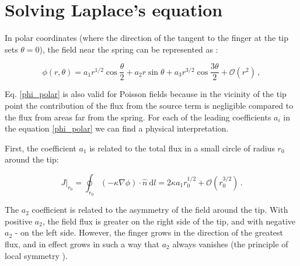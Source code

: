 \documentclass[]{pracamgr}
\begin{document}
  \section{Solving Laplace's equation}\label{chapter:solving}
    
    In polar coordinates (where the direction of the tangent to the finger at the tip sets $\theta = 0$), the field near the spring can be represented as \cite{derrida1992needle , petroff2013bifurcation}:
    
    \begin{equation}\label{phi_polar}
      \phi(r,\theta)=a_1r^{1/2}\cos\frac{\theta}{2}+a_2r \sin \theta+a_3 r^{3/2} \cos\frac{3\theta}{2}+\mathcal{O}\left(r^2\right) \,,
    \end{equation}

    Eq. \eqref{phi_polar} is also valid for Poisson fields because in the vicinity of the tip point the contribution of the flux from the source term is negligible compared to the flux from areas far from the spring. For each of the leading coefficients $a_i$ in the equation \eqref{phi_polar} we can find a physical interpretation.

    First, the coefficient $a_1$ is related to the total flux in a small circle of radius $r_0$ around the tip: 
    
    \begin{equation}\label{circle}
      J|_{r_0} = \oint_{r_0} (-\kappa \nabla \phi) \cdot \hat{n} \ \textrm{d}l = 2 \kappa a_1 r_0^{1/2} + \mathcal{O}\left(r_0^{3/2}\right) \,.
    \end{equation}

    The $a_2$ coefficient is related to the asymmetry of the field around the tip. With positive $a_2$, the field flux is greater on the right side of the tip, and with negative $a_2$ - on the left side. However, the finger grows in the direction of the greatest flux, and in effect grows in such a way that $a_2$ always vanishes (the principle of local symmetry \cite{cohen2015path}).
    
\end{document}
